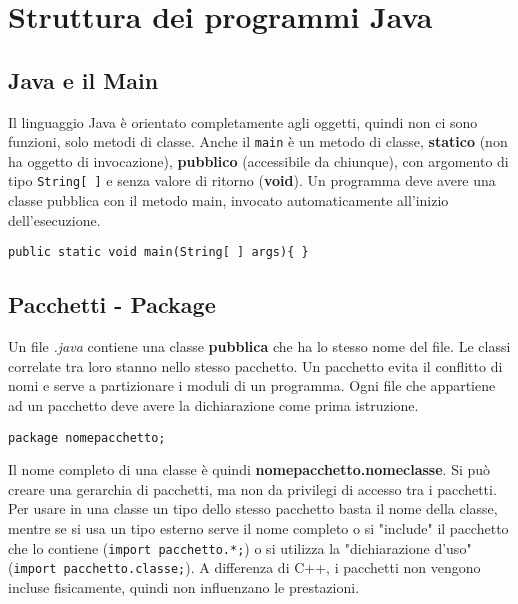 \chapter{Struttura dei programmi Java}

\section{Java e il Main}
Il linguaggio Java è orientato completamente agli oggetti, quindi non ci sono funzioni, solo metodi di classe. Anche il \texttt{main} è un metodo di classe, \textbf{statico} (non ha oggetto di invocazione), \textbf{pubblico} (accessibile da chiunque), con argomento di tipo \texttt{String[ ]} e senza valore di ritorno (\textbf{void}).
Un programma deve avere una classe pubblica con il metodo main, invocato automaticamente all'inizio dell'esecuzione.
\begin{verbatim}
public static void main(String[ ] args){ }
\end{verbatim}

\section{Pacchetti - Package}
Un file \textit{.java} contiene una classe \textbf{pubblica} che ha lo stesso nome del file. Le classi correlate tra loro stanno nello stesso pacchetto. Un pacchetto evita il conflitto di nomi e serve a partizionare i moduli di un programma.
Ogni file che appartiene ad un pacchetto deve avere la dichiarazione come prima istruzione.
\begin{verbatim}
package nomepacchetto;
\end{verbatim}
Il nome completo di una classe è quindi \textbf{nomepacchetto.nomeclasse}.
Si può creare una gerarchia di pacchetti, ma non da privilegi di accesso tra i pacchetti.
Per usare in una classe un tipo dello stesso pacchetto basta il nome della classe, mentre se si usa un tipo esterno serve il nome completo o si "include" il pacchetto che lo contiene (\texttt{import pacchetto.*;}) o si utilizza la "dichiarazione d'uso" (\texttt{import pacchetto.classe;}). A differenza di C++, i pacchetti non vengono incluse fisicamente, quindi non influenzano le prestazioni.